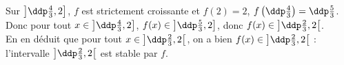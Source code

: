 \documentclass[a4paper, 11pt]{article}
\begin{document}
\begin{correction}
\begin{enumerate}
\begin{enumerate}
Sur $\left\rbrack\ddp\frac{4}{3},2\right\rbrack$, $f$ est strictement croissante et $f\left(2\right) = 2$, $f\left(\ddp\frac{4}{3}\right)=\ddp\frac{5}{3}$. Donc pour tout $x \in \left\rbrack \ddp\frac{4}{3},2\right\rbrack$, $f(x) \in \left\rbrack \ddp\frac{5}{3},2\right\rbrack$, donc $f(x) \in \left\rbrack \ddp\frac{2}{3},2\right\lbrack$.\\
En en d\'eduit que pour tout $x \in \left\rbrack \ddp\frac{2}{3},2\right\lbrack$, on a bien $f(x) \in \left\rbrack \ddp\frac{2}{3},2\right\lbrack$ : l'intervalle $\left\rbrack \ddp\frac{2}{3},2\right\lbrack$ est stable par $f$.\\

\end{enumerate}
\end{enumerate}
\end{correction}
\end{document}
